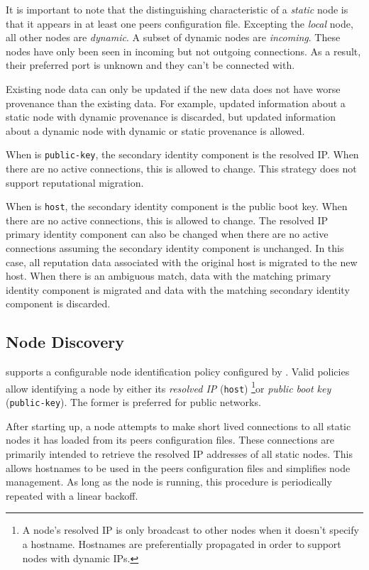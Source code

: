 It is important to note that the distinguishing characteristic of a \emph{static} node is that it appears in at least one peers configuration file.
Excepting the \emph{local} node, all other nodes are \emph{dynamic}.
A subset of dynamic nodes are \emph{incoming}.
These nodes have only been seen in incoming but not outgoing connections.
As a result, their preferred port is unknown and they can't be connected with.

Existing node data can only be updated if the new data does not have worse provenance than the existing data.
For example, updated information about a static node with dynamic provenance is discarded, but updated information about a dynamic node with dynamic or static provenance is allowed.

When  is \texttt{public-key}, the secondary identity component is the resolved IP.
When there are no active connections, this is allowed to change.
This strategy does not support reputational migration.

When  is \texttt{host}, the secondary identity component is the public boot key.
When there are no active connections, this is allowed to change.
The resolved IP primary identity component can also be changed when there are no active connections assuming the secondary identity component is unchanged.
In this case, all reputation data associated with the original host is migrated to the new host.
When there is an ambiguous match, data with the matching primary identity component is migrated and data with the matching secondary identity component is discarded.

\subsection{Node Discovery}
\label{sec:network:discovery}

\codenamespace supports a configurable node identification policy configured by .
Valid policies allow identifying a node by either its \textit{resolved IP} (\texttt{host})
\footnote{
	A node's resolved IP is only broadcast to other nodes when it doesn't specify a hostname.
	Hostnames are preferentially propagated in order to support nodes with dynamic IPs.
}or \textit{public boot key} (\texttt{public-key}).
The former is preferred for public networks.

After starting up, a node attempts to make short lived connections to all static nodes it has loaded from its peers configuration files.
These connections are primarily intended to retrieve the resolved IP addresses of all static nodes.
This allows hostnames to be used in the peers configuration files and simplifies node management.
As long as the node is running, this procedure is periodically repeated with a linear backoff.

